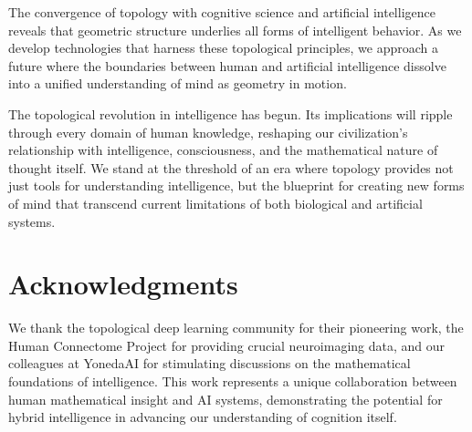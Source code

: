 \documentclass[11pt]{article}
\begin{document}
The convergence of topology with cognitive science and artificial intelligence reveals that geometric structure underlies all forms of intelligent behavior. As we develop technologies that harness these topological principles, we approach a future where the boundaries between human and artificial intelligence dissolve into a unified understanding of mind as geometry in motion.

The topological revolution in intelligence has begun. Its implications will ripple through every domain of human knowledge, reshaping our civilization's relationship with intelligence, consciousness, and the mathematical nature of thought itself. We stand at the threshold of an era where topology provides not just tools for understanding intelligence, but the blueprint for creating new forms of mind that transcend current limitations of both biological and artificial systems.

\section*{Acknowledgments}

We thank the topological deep learning community for their pioneering work, the Human Connectome Project for providing crucial neuroimaging data, and our colleagues at YonedaAI for stimulating discussions on the mathematical foundations of intelligence. This work represents a unique collaboration between human mathematical insight and AI systems, demonstrating the potential for hybrid intelligence in advancing our understanding of cognition itself.
\end{document}
